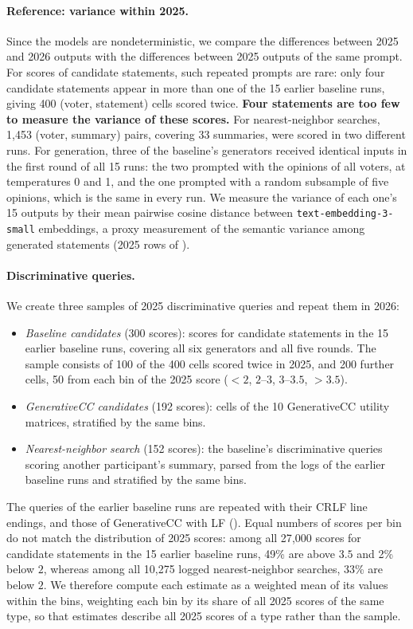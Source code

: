 \documentclass[letterpaper]{article} %
\begin{document}
\paragraph{Reference: variance within 2025.}
Since the models are nondeterministic, we compare the differences between 2025 and 2026 outputs with the differences between 2025 outputs of the same prompt.
For scores of candidate statements, such repeated prompts are rare: only four candidate statements appear in more than one of the 15 earlier baseline runs, giving 400 (voter, statement) cells scored twice.
\textbf{Four statements are too few to measure the variance of these scores.}
For nearest-neighbor searches, 1{,}453 (voter, summary) pairs, covering 33 summaries, were scored in two different runs.
For generation, three of the baseline's generators received identical inputs in the first round of all 15 runs: the two prompted with the opinions of all voters, at temperatures 0 and 1, and the one prompted with a random subsample of five opinions, which is the same in every run.
We measure the variance of each one's 15 outputs by their mean pairwise cosine distance between \texttt{text-embedding-3-small} embeddings, a proxy measurement of the semantic variance among generated statements (2025 rows of ).

\paragraph{Discriminative queries.}
We create three samples of 2025 discriminative queries and repeat them in 2026:
\begin{itemize}
    \item \emph{Baseline candidates} (300 scores): scores for candidate statements in the 15 earlier baseline runs, covering all six generators and all five rounds.
    The sample consists of 100 of the 400 cells scored twice in 2025, and 200 further cells, 50 from each bin of the 2025 score (\(<2\), \(2\)--\(3\), \(3\)--\(3.5\), \(>3.5\)).
    \item \emph{GenerativeCC candidates} (192 scores): cells of the 10 GenerativeCC utility matrices, stratified by the same bins.
    \item \emph{Nearest-neighbor search} (152 scores): the baseline's discriminative queries scoring another participant's summary, parsed from the logs of the earlier baseline runs and stratified by the same bins.
\end{itemize}
The queries of the earlier baseline runs are repeated with their CRLF line endings, and those of GenerativeCC with LF ().
Equal numbers of scores per bin do not match the distribution of 2025 scores: among all 27{,}000 scores for candidate statements in the 15 earlier baseline runs, 49\% are above \(3.5\) and 2\% below \(2\), whereas among all 10{,}275 logged nearest-neighbor searches, 33\% are below \(2\).
We therefore compute each estimate as a weighted mean of its values within the bins, weighting each bin by its share of all 2025 scores of the same type, so that estimates describe all 2025 scores of a type rather than the sample.
\end{document}
